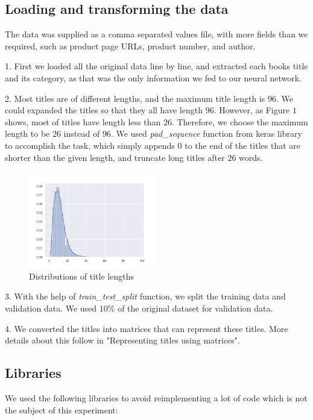 \documentclass[jou,apacite, 10px]{apa6}
\begin{document}
\subsection{Loading and transforming the data}
The data was supplied as a comma separated values file, with more fields than we required, such as product page URLs, product number, and author.

\rule{0pt}{4ex}  1. First we loaded all the original data line by line, and extracted each books title and its category, as that was the only information we fed to our neural network.

\rule{0pt}{4ex}  2. Most titles are of different lengths, and the maximum title length is $96$. We could expanded the titles so that they all have length $96$. However, as Figure $1$ shows, most of titles have length less than $26$. Therefore, we choose the maximum length to be $26$ instead of $96$. We used \textit{pad\_sequence} function from keras library to accomplish the task, which simply appends $0$ to the end of the titles that are shorter than the given length, and truncate long titles after $26$ words.

\begin{figure}[h!]
\captionsetup{justification=centering}
     \includegraphics[width=0.5\textwidth]{images/title_lengths}
     \caption{Distributions of title lengths}
\end{figure}

\rule{0pt}{4ex}  3. With the help of \textit{train\_test\_split} function, we split the training data and validation data. We used $10\%$ of the original dataset for validation data.

\rule{0pt}{4ex}  4. We converted the titles into matrices that can represent these titles. More details about this follow in "Representing titles using matrices".

\subsection{Libraries}
We used the following libraries to avoid reimplementing a lot of code which is not the subject of this experiment:
\end{document}
